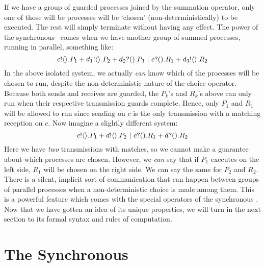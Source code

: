 If we have a group of guarded processes joined by the summation operator, only one of those will be processes will be `chosen' (non-deterministically) to be executed.  
The rest will simply terminate without having any effect.  
The power of the synchronous \picalc\ comes when we have another group of summed processes, running in parallel, something like: 
\[
	{c}!\langle{}\rangle.P_1 + {d_1}!\langle{}\rangle.P_2 + {d_2}?({}).P_3 \ |\  {c}?({}).R_1 + {d_3}!\langle{}\rangle.R_2
\]
In the above isolated system, we actually \emph{can} know which of the processes will be chosen to run, despite the non-deterministic nature of the choice operator.  
Because both sends and receives are guarded, the $P_k$'s and $R_k$'s above can only run when their respective transmission guards complete.  
Hence, only $P_1$ and $R_1$ will be allowed to run since sending on $c$ is the only transmission with a matching reception on $c$.  
Now imagine a slightly different system:
\[
	{c}!\langle{}\rangle.P_1 + {d}!\langle{}\rangle.P_2 \ |\  {c}?({}).R_1 + {d}?({}).R_2
\]
Here we have \emph{two} transmissions with matches, so we cannot make a guarantee about which processes are chosen.  
However, we \emph{can} say that if $P_1$ executes on the left side, $R_1$ will be chosen on the right side.  
We can say the same for $P_2$ and $R_2$.  
There is a silent, implicit sort of communication that can happen between groups of parallel processes when a non-deterministic choice is made among them.  
This is a powerful feature which comes with the special operators of the synchronous \picalc.  Now that we have gotten an idea of its unique properties, we will turn in the next section to its formal syntax and rules of computation.

\section{The Synchronous \Picalc}\label{Synchronous picalc}

